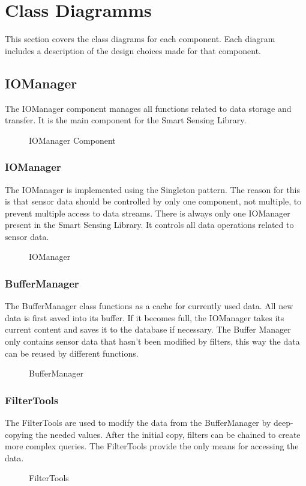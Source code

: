 \documentclass[12pt]{article}
\newcounter{fr}
\begin{document}
\newpage
\section{Class Diagramms}
This section covers the class diagrams for each component. Each diagram includes a description of the design choices made for that component.

\subsection{IOManager}
The IOManager component manages all functions related to data storage and transfer. It is the main component for the Smart Sensing Library.
\begin{figure}[ht]
\centering

\caption{\label{fig:bild5} IOManager Component}
\end{figure}


\subsubsection{IOManager}
The IOManager is implemented using the Singleton pattern. The reason for this is that sensor data should be controlled by only one component, not multiple, to prevent multiple access to data streams. There is always only one IOManager present in the Smart Sensing Library. It controls all data operations related to sensor data.
\begin{figure}[ht]
\centering

\caption{\label{fig:bild6} IOManager}
\end{figure}

\subsubsection{BufferManager}
The BufferManager class functions as a cache for currently used data. All new data is first saved into its buffer. If it becomes full, the IOManager takes its current content and saves it to the database if necessary. The Buffer Manager only contains sensor data that hasn't been modified by filters, this way the data can be reused by different functions.
\begin{figure}[ht]
\centering

\caption{\label{fig:bild7} BufferManager}
\end{figure}

\newpage
\subsubsection{FilterTools}
The FilterTools are used to modify the data from the BufferManager by deep-copying the needed values. After the initial copy, filters can be chained to create more complex queries. The FilterTools provide the only means for accessing the data.
\begin{figure}[ht]
\centering

\caption{\label{fig:bild8} FilterTools}
\end{figure}
\newpage
\end{document}
